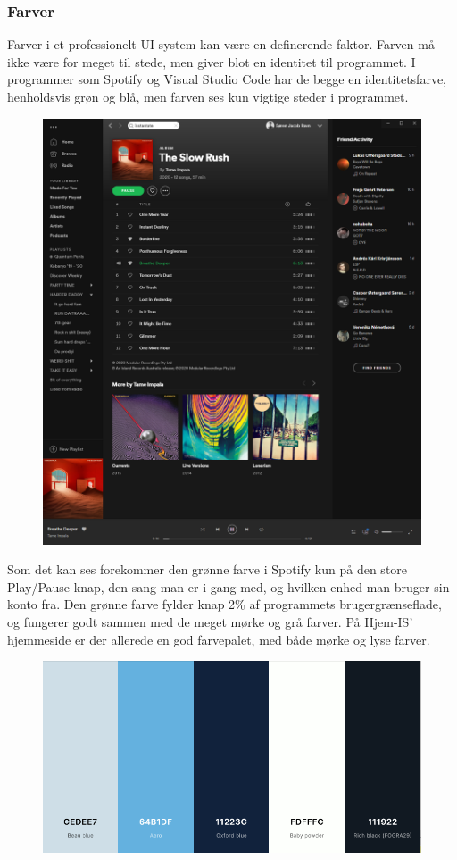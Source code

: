 \subsubsection{Farver}
Farver i et professionelt UI system kan være en definerende faktor. Farven må ikke være for meget til stede, men giver blot en identitet til programmet. I programmer som Spotify og Visual Studio Code har de begge en identitetsfarve, henholdsvis grøn og blå, men farven ses kun vigtige steder i programmet. 
\begin{figure}
    \centering
    \includegraphics[width=\textwidth]{figures/Preliminary/Spotify.png}
    \label{fig:spotify}
\end{figure}
Som det kan ses forekommer den grønne farve i Spotify kun på den store Play/Pause knap, den sang man er i gang med, og hvilken enhed man bruger sin konto fra. Den grønne farve fylder knap 2\% af programmets brugergrænseflade, og fungerer godt sammen med de meget mørke og grå farver. 
På Hjem-IS' hjemmeside er der allerede en god farvepalet, med både mørke og lyse farver. 
\begin{figure}
    \centering
    \includegraphics[width=\textwidth]{figures/Preliminary/farvepalet.png}
    \label{fig:farvepalet}
\end{figure}
